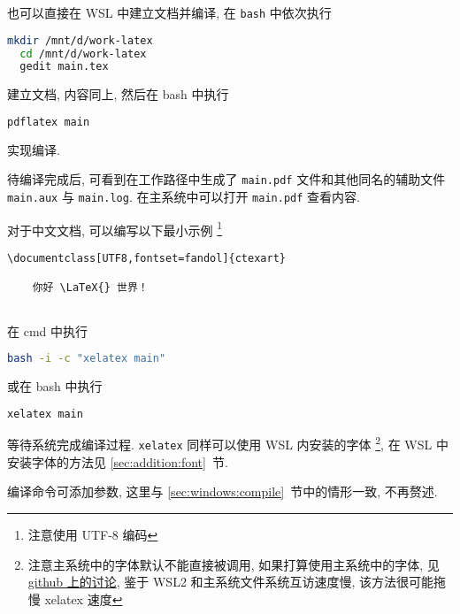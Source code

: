 也可以直接在 WSL 中建立文档并编译,
在 \texttt{bash} 中依次执行
\begin{lstlisting}[language=bash]
  mkdir /mnt/d/work-latex
  cd /mnt/d/work-latex
  gedit main.tex
\end{lstlisting}
建立文档,
内容同上,
然后在 \textsf{bash} 中执行
\begin{lstlisting}[language=bash]
  pdflatex main
\end{lstlisting}
实现编译.

待编译完成后, 可看到在工作路径中生成了 \texttt{main.pdf}
文件和其他同名的辅助文件 \texttt{main.aux} 与 \texttt{main.log}.
在主系统中可以打开 \texttt{main.pdf} 查看内容.

对于中文文档,
可以编写以下最小示例%
\footnote{注意使用 UTF-8 编码}%
\begin{lstlisting}[language={[LaTeX]TeX}]
  \documentclass[UTF8,fontset=fandol]{ctexart}
  
    你好 \LaTeX{} 世界！
  
\end{lstlisting}
在 \textsf{cmd} 中执行
\begin{lstlisting}[language=bash]
  bash -i -c "xelatex main"
\end{lstlisting}
或在 \textsf{bash} 中执行
\begin{lstlisting}[language=bash]
  xelatex main
\end{lstlisting}
等待系统完成编译过程. 
\texttt{xelatex} 同样可以使用 WSL 内安装的字体%
\footnote{注意主系统中的字体默认不能直接被调用,
如果打算使用主系统中的字体,
见
\href{https://github.com/OsbertWang/install-latex-guide-zh-cn/issues/14}{github 上的讨论},
鉴于 WSL2 和主系统文件系统互访速度慢,
该方法很可能拖慢 xelatex 速度},
在 WSL 中安装字体的方法见 \ref{sec:addition:font}~节.

编译命令可添加参数, 这里与 \ref{sec:windows:compile}~节中的情形一致, 不再赘述.
